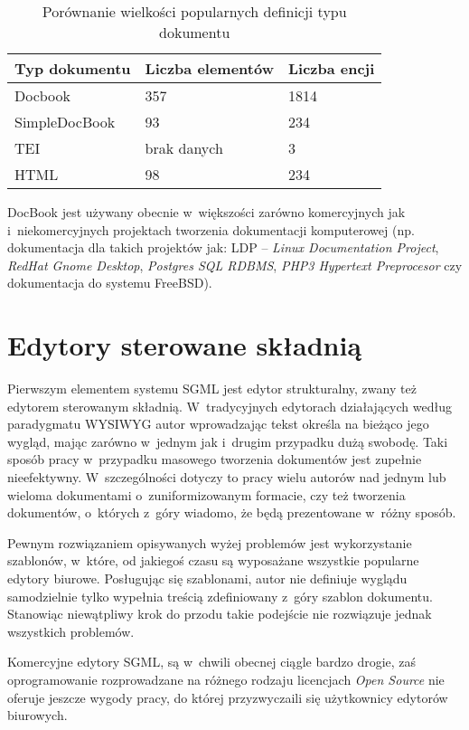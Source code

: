 \documentclass[brudnopis]{xmgr}
\begin{document}
\begin{table}[!tbh]
\begin{tabular}{|l|l|l|} \hline
Typ dokumentu & Liczba elementów & Liczba encji \\ \hline
Docbook & 357 & 1814 \\ \hline
SimpleDocBook  & 93  & 234 \\ \hline
TEI & brak danych & 3 \\ \hline
HTML & 98  & 234 \\ \hline
\end{tabular}
\caption{Porównanie wielkości popularnych definicji 
  typu dokumentu\label{tab:dtd-cmp}}
\end{table}

DocBook jest używany obecnie w~większości zarówno komercyjnych jak
i~niekomercyjnych projektach tworzenia dokumentacji komputerowej
(np. dokumentacja dla takich projektów jak: LDP -- \textit{Linux
Documentation Project}, \textit{RedHat Gnome Desktop},
\textit{Postgres SQL RDBMS}, \textit{PHP3 Hypertext Preprocesor} czy
dokumentacja do systemu FreeBSD).
    
\section{Edytory sterowane składnią\label{s:edytor}}

Pierwszym elementem systemu SGML jest edytor
strukturalny, zwany też edytorem sterowanym
składnią. W~tradycyjnych edytorach działających według paradygmatu
WYSIWYG autor wprowadzając tekst określa na bieżąco
jego wygląd, mając zarówno w~jednym jak i~drugim przypadku dużą
swobodę.  Taki sposób pracy w~przypadku masowego tworzenia dokumentów
jest zupełnie nieefektywny. W~szczególności dotyczy to pracy wielu
autorów nad jednym lub wieloma dokumentami o~zuniformizowanym
formacie, czy też tworzenia dokumentów, o~których z~góry wiadomo, że
będą prezentowane w~różny sposób.

Pewnym rozwiązaniem opisywanych wyżej problemów jest wykorzystanie
szablonów, w~które, od jakiegoś czasu są wyposażane wszystkie
popularne edytory biurowe.  Posługując się
szablonami, autor nie definiuje wyglądu samodzielnie tylko wypełnia
treścią zdefiniowany z~góry szablon dokumentu.  
Stanowiąc niewątpliwy
krok do przodu takie podejście nie rozwiązuje jednak wszystkich
problemów.

Komercyjne edytory SGML, są w~chwili obecnej ciągle bardzo
drogie, zaś oprogramowanie rozprowadzane na różnego rodzaju licencjach
\emph{Open Source\/} nie oferuje jeszcze wygody pracy, do której
przyzwyczaili się użytkownicy edytorów biurowych.  
\end{document}
